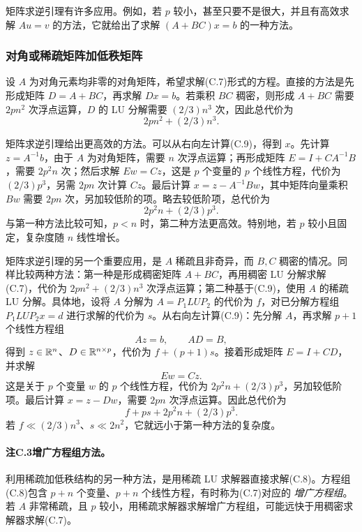 矩阵求逆引理有许多应用。例如，若 $p$ 较小，甚至只要不是很大，并且有高效求解 $Au=v$ 的方法，它就给出了求解 $(A+BC)x=b$ 的一种方法。

\subsubsection*{对角或稀疏矩阵加低秩矩阵}
设 $A$ 为对角元素均非零的对角矩阵，希望求解(C.7)形式的方程。直接的方法是先形成矩阵 $D=A+BC$，再求解 $Dx=b$。若乘积 $BC$ 稠密，则形成 $A+BC$ 需要 $2pn^2$ 次浮点运算，$D$ 的 LU 分解需要 $(2/3)n^3$ 次，因此总代价为
\[
 2pn^2+(2/3)n^3.
\]

矩阵求逆引理给出更高效的方法。可以从右向左计算(C.9)，得到 $x$。先计算 $z=A^{-1}b$，由于 $A$ 为对角矩阵，需要 $n$ 次浮点运算；再形成矩阵 $E=I+CA^{-1}B$，需要 $2p^2n$ 次；然后求解 $Ew=Cz$，这是 $p$ 个变量的 $p$ 个线性方程，代价为 $(2/3)p^3$，另需 $2pn$ 次计算 $Cz$。最后计算 $x=z-A^{-1}Bw$，其中矩阵向量乘积 $Bw$ 需要 $2pn$ 次，另加较低阶的项。略去较低阶项，总代价为
\[
 2p^2n+(2/3)p^3.
\]
与第一种方法比较可知，$p<n$ 时，第二种方法更高效。特别地，若 $p$ 较小且固定，复杂度随 $n$ 线性增长。

矩阵求逆引理的另一个重要应用，是 $A$ 稀疏且非奇异，而 $B,C$ 稠密的情况。同样比较两种方法：第一种是形成稠密矩阵 $A+BC$，再用稠密 LU 分解求解(C.7)，代价为 $2pn^2+(2/3)n^3$ 次浮点运算；第二种基于(C.9)，使用 $A$ 的稀疏 LU 分解。具体地，设将 $A$ 分解为 $A=P_1LUP_2$ 的代价为 $f$，对已分解方程组 $P_1LUP_2x=d$ 进行求解的代价为 $s$。从右向左计算(C.9)：先分解 $A$，再求解 $p+1$ 个线性方程组
\[
 Az=b,\qquad AD=B,
\]
得到 $z\in\mathbb R^n$、$D\in\mathbb R^{n\times p}$，代价为 $f+(p+1)s$。接着形成矩阵 $E=I+CD$，并求解
\[
 Ew=Cz.
\]
这是关于 $p$ 个变量 $w$ 的 $p$ 个线性方程，代价为 $2p^2n+(2/3)p^3$，另加较低阶项。最后计算 $x=z-Dw$，需要 $2pn$ 次浮点运算。因此总代价为
\[
 f+ps+2p^2n+(2/3)p^3.
\]
若 $f\ll(2/3)n^3$、$s\ll2n^2$，它就远小于第一种方法的复杂度。

\paragraph{注C.3\quad 增广方程组方法。}
利用稀疏加低秩结构的另一种方法，是用稀疏 LU 求解器直接求解(C.8)。方程组(C.8)包含 $p+n$ 个变量、$p+n$ 个线性方程，有时称为(C.7)对应的
\emph{增广方程组}。若 $A$ 非常稀疏，且 $p$ 较小，用稀疏求解器求解增广方程组，可能远快于用稠密求解器求解(C.7)。

